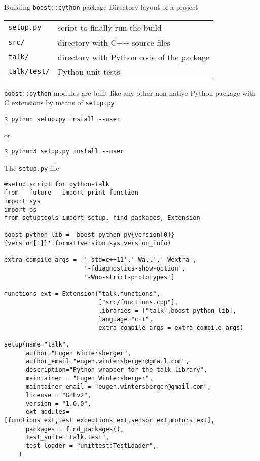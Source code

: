 

\begin{frame}[fragile]{Building \texttt{boost::python} package}
    Directory layout of a project
    \begin{center}
        \begin{tabular}{ll}
            \texttt{setup.py} & script to finally run the build \\
            \texttt{src/}     & directory with C++ source files \\
            \texttt{talk/}    & directory with Python code of the package \\
            \texttt{talk/test/}    & Python unit tests \\
        \end{tabular}
    \end{center}
    \vspace{0.05\textheight}
    \texttt{boost::python} modules are built like any other non-native 
    Python package with C extensions by means of \texttt{setup.py}
    \vspace{0.05\textheight}
    \begin{verbatim}
$ python setup.py install --user 
    \end{verbatim}
    or 
    \begin{verbatim}
$ python3 setup.py install --user
    \end{verbatim}
\end{frame}

\begin{frame}[fragile]{The \texttt{setup.py} file}
    \begin{verbatim}
#setup script for python-talk
from __future__ import print_function
import sys
import os
from setuptools import setup, find_packages, Extension

boost_python_lib = 'boost_python-py{version[0]}{version[1]}'.format(version=sys.version_info)

extra_compile_args = ['-std=c++11','-Wall','-Wextra',
                      '-fdiagnostics-show-option',
                      '-Wno-strict-prototypes']

functions_ext = Extension("talk.functions",
                          ["src/functions.cpp"],
                          libraries = ["talk",boost_python_lib],
                          language="c++",
                          extra_compile_args = extra_compile_args)

setup(name="talk",
      author="Eugen Wintersberger",
      author_email="eugen.wintersberger@gmail.com",
      description="Python wrapper for the talk library",
      maintainer = "Eugen Wintersberger",
      maintainer_email = "eugen.wintersberger@gmail.com",
      license = "GPLv2",
      version = "1.0.0",
      ext_modules=[functions_ext,test_exceptions_ext,sensor_ext,motors_ext],
      packages = find_packages(),
      test_suite="talk.test",
      test_loader = "unittest:TestLoader",
    )
    \end{verbatim}
\end{frame}

